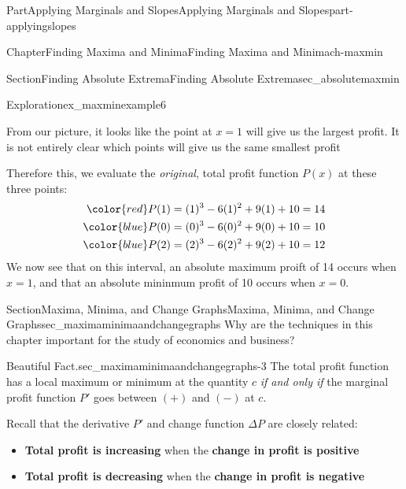 \documentclass{tufte-book}
\newcommand{\terminology}[1]{\textbf{#1}}
\numberwithin{equation}{chapter}
\newcommand{\amp}{&}
\begin{document}
\begin{partptx}{Part}{Applying Marginals and Slopes}{}{Applying Marginals and Slopes}{}{}{part-applyingslopes}
\begin{chapterptx}{Chapter}{Finding Maxima and Minima}{}{Finding Maxima and Minima}{}{}{ch-maxmin}
\begin{sectionptx}{Section}{Finding Absolute Extrema}{}{Finding Absolute Extrema}{}{}{sec_absolutemaxmin}
\begin{exploration}{Exploration}{}{ex_maxminexample6}
\begin{enumerate}[font=\bfseries,label=(\alph*),ref=\alph*]
\begin{image}{0.25}{0.5}{0.25}{}
{
}%
\end{image}%
%
\par
From our picture, it looks like the point at \(x=1\) will give us the largest profit. It is not entirely clear which points will give us the same smallest profit%
\par
Therefore this, we evaluate the \emph{original}, total profit function \(P(x)\) at these three points:%
%
\begin{align*}
\color{red}  P(1) \amp = (1)^3 - 6(1)^2 + 9(1) + 10 = 14\\
\color{blue} P(0) \amp = (0)^3 - 6(0)^2 + 9(0) + 10 = 10\\
\color{blue} P(2) \amp = (2)^3 - 6(2)^2 + 9(2) + 10 = 12
\end{align*}
We now see that on this interval, an absolute maximum proift of \textdollar{}14 occurs when \(x=1\), and that an absolute mininmum profit of \textdollar{}10 occurs when \(x=0\).%
\end{enumerate}%
\end{exploration}%
\end{sectionptx}
%
%
\typeout{************************************************}
\typeout{************************************************}
%
\begin{sectionptx}{Section}{Maxima, Minima, and Change Graphs}{}{Maxima, Minima, and Change Graphs}{}{}{sec_maximaminimaandchangegraphs}
Why are the techniques in this chapter important for the study of economics and business?%
\begin{paragraphs}{Beautiful Fact.}{sec_maximaminimaandchangegraphs-3}%
The total profit function has a local maximum or minimum at the quantity \(c\) \emph{if and only if} the marginal profit function \(P'\) goes between \((+)\) and \((-)\) at \(c\).%
\par
Recall that the derivative \(P'\) and change function \(\Delta P\) are closely related:%
\begin{itemize}[label=\textbullet]
\item{}\terminology{Total profit is increasing} when the \terminology{change in profit is positive}%
\item{}\terminology{Total profit is decreasing} when the \terminology{change in profit is negative}%

\end{itemize}
\end{paragraphs}
\end{sectionptx}
\end{chapterptx}
\end{partptx}
\end{document}

